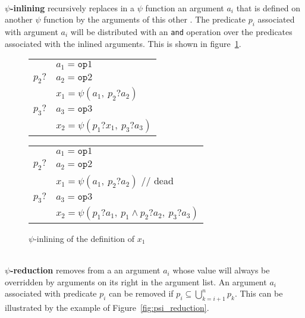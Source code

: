 ~\\
{\bf $\psi$-inlining} recursively replaces in a $\psi$
  function an argument ${a_i}$ that is defined on another $\psi$
  function by the arguments of this other \psifun. The
  predicate ${p_i}$ associated with argument ${a_i}$ will be distributed
  with an \texttt{and} operation over the predicates associated with the
  inlined arguments. This is shown in figure~\ref{fig:psi_inlining}.
\begin{figure}[h]
\begin{center}
\footnotesize\hfill
{
\begin{tabular}{ll}
             & ${a_1 = \texttt{op}1}$  \\
${p_2?}$ & ${a_2 = \texttt{op}2}$        \\
             & ${x_1 = \psi(a_1,\ p_2?a_2)}$\\
${p_3?}$ & ${a_3 = \texttt{op}3}$             \\
             & ${x_2 = \psi(p_1?x_1,\ p_3?a_3)}$ \\
\end{tabular}
} \hfill
{
\begin{tabular}{ll}
                & ${a_1 = \texttt{op}1}$ \\
 ${p_2?}$ & ${a_2 = \texttt{op}2}$ \\
           & \color{gray} $x_1 = \psi(a_1,\ p_2?a_2)$ // dead \\
 ${p_3?}$ & ${a_3 = \texttt{op}3}$ \\
         & ${x_2 = \psi(p_1?a_1,\ p_1\wedge p_2?a_2,\ p_3?a_3)}$ \\
\end{tabular}
}
\caption{$\psi$-inlining of the definition of $x_1$}
\label{fig:psi_inlining}
\end{center}
\end{figure}

~\\
{\bf $\psi$-reduction} removes from a \psifun an
  argument ${a_i}$ whose value will always be overridden by arguments on
  its right in the argument list. An argument ${a_i}$ associated
  with predicate ${p_i}$ can be removed if ${p_i \subseteq
    \bigcup_{k=i+1}^n p_k}$. This can be illustrated by the example of
  Figure~\ref{fig:psi_reduction}.



